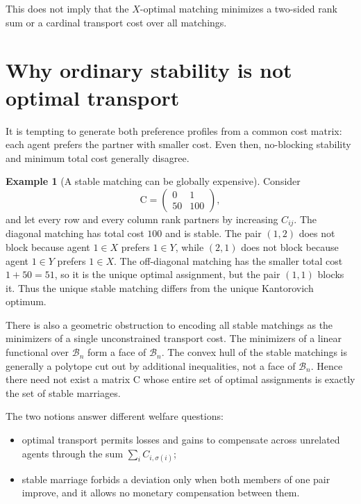 \documentclass[11pt]{article}
\theoremstyle{definition}
\newtheorem{example}[theorem]{Example}
\theoremstyle{remark}
\newcommand{\Cmat}{\mathrm C}
\newcommand{\Bcal}{\mathcal B}
\begin{document}
This does not imply that the \(X\)-optimal matching minimizes a two-sided rank
sum or a cardinal transport cost over all matchings.

\section{Why ordinary stability is not optimal transport}
\label{sec:not-equivalent}

It is tempting to generate both preference profiles from a common cost matrix:
each agent prefers the partner with smaller cost. Even then, no-blocking
stability and minimum total cost generally disagree.

\begin{example}[A stable matching can be globally expensive]
\label{ex:counterexample}
Consider
\begin{equation}\label{eq:counterexample-cost}
  \Cmat=\begin{pmatrix}0&1\\50&100\end{pmatrix},
\end{equation}
and let every row and every column rank partners by increasing \(C_{ij}\). The
diagonal matching has total cost \(100\) and is stable. The pair \((1,2)\) does
not block because agent \(1\in X\) prefers \(1\in Y\), while \((2,1)\) does not
block because agent \(1\in Y\) prefers \(1\in X\). The off-diagonal matching
has the smaller total cost \(1+50=51\), so it is the unique optimal assignment,
but the pair \((1,1)\) blocks it. Thus the unique stable matching differs from
the unique Kantorovich optimum.
\end{example}

There is also a geometric obstruction to encoding all stable matchings as the
minimizers of a single unconstrained transport cost. The minimizers of a linear
functional over \(\Bcal_n\) form a face of \(\Bcal_n\). The convex hull of the
stable matchings is generally a polytope cut out by additional inequalities,
not a face of \(\Bcal_n\). Hence there need not exist a matrix \(\Cmat\) whose
entire set of optimal assignments is exactly the set of stable marriages.

The two notions answer different welfare questions:
\begin{itemize}[leftmargin=2em]
  \item optimal transport permits losses and gains to compensate across
  unrelated agents through the sum \(\sum_i C_{i,\sigma(i)}\);
  \item stable marriage forbids a deviation only when both members of one pair
  improve, and it allows no monetary compensation between them.
\end{itemize}
\end{document}

